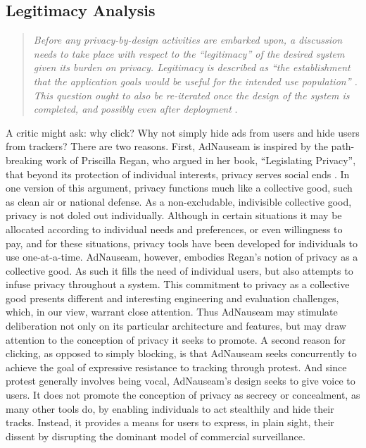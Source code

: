 \documentclass[conference]{IEEEtran}
\begin{document}
\subsection{Legitimacy Analysis}

\vspace{1mm}
\blockquote{\emph{Before any privacy-by-design activities are embarked upon, a discussion needs to take place with respect to the “legitimacy” of the desired system given its burden on privacy. Legitimacy is described as “the establishment that the application goals would be useful for the intended use population” \cite{Iachello}. This question ought to also be re-iterated once the design of the system is completed, and possibly even after deployment} \cite{Gurses-1}.}
\vspace{1mm}

A critic might ask: why click? Why not simply hide ads from users and hide users from trackers? There are two reasons. First, AdNauseam is inspired by the path-breaking work of Priscilla Regan, who argued in her book, “Legislating Privacy”, that beyond its protection of individual interests, privacy serves social ends \cite{Regan}. In one version of this argument, privacy functions much like a collective good, such as clean air or national defense. As a non-excludable, indivisible collective good, privacy is not doled out individually. Although in certain situations it may be allocated according to individual needs and preferences, or even willingness to pay, and for these situations, privacy tools have been developed for individuals to use one-at-a-time. AdNauseam, however, embodies Regan's notion of privacy as a collective good. As such it fills the need of individual users, but also attempts to infuse privacy throughout a system. This commitment to privacy as a collective good presents different and interesting engineering and evaluation challenges, which, in our view, warrant close attention. Thus AdNauseam may stimulate deliberation not only on its particular architecture and features, but may draw attention to the conception of privacy it seeks to promote. A second reason for clicking, as opposed to simply blocking, is that AdNauseam seeks concurrently to achieve the goal of expressive resistance to tracking through protest. And since protest generally involves being vocal, AdNauseam's design seeks to give voice to users. It does not promote the conception of privacy as secrecy or concealment, as many other tools do, by enabling individuals to act stealthily and hide their tracks. Instead, it provides a means for users to express, in plain sight, their dissent by disrupting the dominant model of commercial surveillance.
\end{document}
